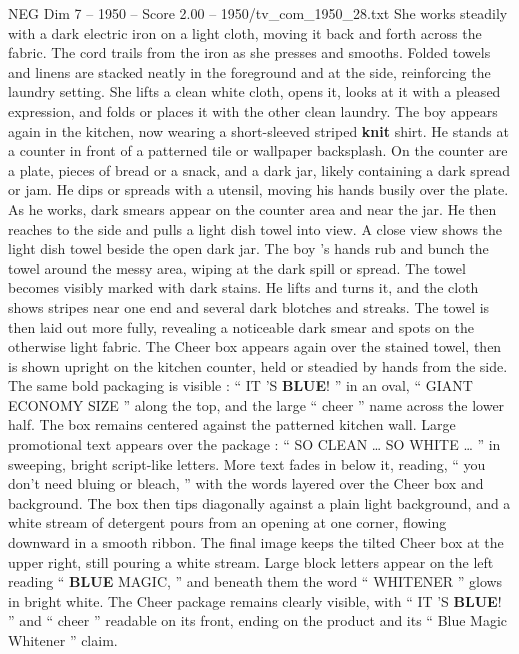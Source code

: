 \begin{textsample}{NEG Dim 7 – 1950 – Score 2.00 – 1950/tv\_com\_1950\_28.txt}
She works steadily with a dark electric iron on a light cloth, moving it back and forth across the fabric.
The cord trails from the iron as she presses and smooths.
Folded towels and linens are stacked neatly in the foreground and at the side, reinforcing the laundry setting.
She lifts a clean white cloth, opens it, looks at it with a pleased expression, and folds or places it with the other clean laundry.
The boy appears again in the kitchen, now wearing a short-sleeved striped \textbf{knit} shirt.
He stands at a counter in front of a patterned tile or wallpaper backsplash.
On the counter are a plate, pieces of bread or a snack, and a dark jar, likely containing a dark spread or jam.
He dips or spreads with a utensil, moving his hands busily over the plate.
As he works, dark smears appear on the counter area and near the jar.
He then reaches to the side and pulls a light dish towel into view.
A close view shows the light dish towel beside the open dark jar.
The boy ’s hands rub and bunch the towel around the messy area, wiping at the dark spill or spread.
The towel becomes visibly marked with dark stains.
He lifts and turns it, and the cloth shows stripes near one end and several dark blotches and streaks.
The towel is then laid out more fully, revealing a noticeable dark smear and spots on the otherwise light fabric.
The Cheer box appears again over the stained towel, then is shown upright on the kitchen counter, held or steadied by hands from the side.
The same bold packaging is visible : “ IT ’S \textbf{BLUE}! ” in an oval, “ GIANT ECONOMY SIZE ” along the top, and the large “ cheer ” name across the lower half.
The box remains centered against the patterned kitchen wall.
Large promotional text appears over the package : “ SO CLEAN … SO WHITE … ” in sweeping, bright script-like letters.
More text fades in below it, reading, “ you don't need bluing or bleach, ” with the words layered over the Cheer box and background.
The box then tips diagonally against a plain light background, and a white stream of detergent pours from an opening at one corner, flowing downward in a smooth ribbon.
The final image keeps the tilted Cheer box at the upper right, still pouring a white stream.
Large block letters appear on the left reading “ \textbf{BLUE} MAGIC, ” and beneath them the word “ WHITENER ” glows in bright white.
The Cheer package remains clearly visible, with “ IT ’S \textbf{BLUE}! ” and “ cheer ” readable on its front, ending on the product and its “ Blue Magic Whitener ” claim.

\end{textsample}
